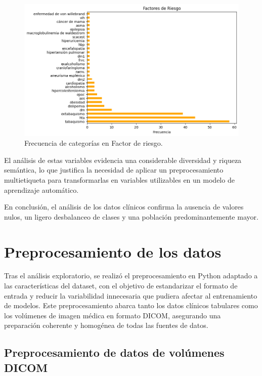 \begin{figure}[!htbp]
    \centering
    \includegraphics[width=1\textwidth]{img/barras_factor_riesgo.png}
    \caption{Frecuencia de categorías en Factor de riesgo.}
    \label{fig:distribucion_factor_riesgo}
\end{figure}


El análisis de estas variables evidencia una considerable diversidad y riqueza semántica, lo que justifica la necesidad de aplicar un preprocesamiento multietiqueta para transformarlas en variables utilizables en un modelo de aprendizaje automático.

En conclusión, el análisis de los datos clínicos confirma la ausencia de valores nulos, un ligero desbalanceo de clases y una población predominantemente mayor.





\section{Preprocesamiento de los datos} \label{sec:preprocesamiento}

Tras el análisis exploratorio, se realizó el preprocesamiento en Python adaptado a las características del dataset, con el objetivo de estandarizar el formato de entrada y reducir la variabilidad innecesaria que pudiera afectar al entrenamiento de modelos. Este preprocesamiento abarca tanto los datos clínicos tabulares como los volúmenes de imagen médica en formato DICOM, asegurando una preparación coherente y homogénea de todas las fuentes de datos.

\subsection{Preprocesamiento de datos de volúmenes DICOM}

